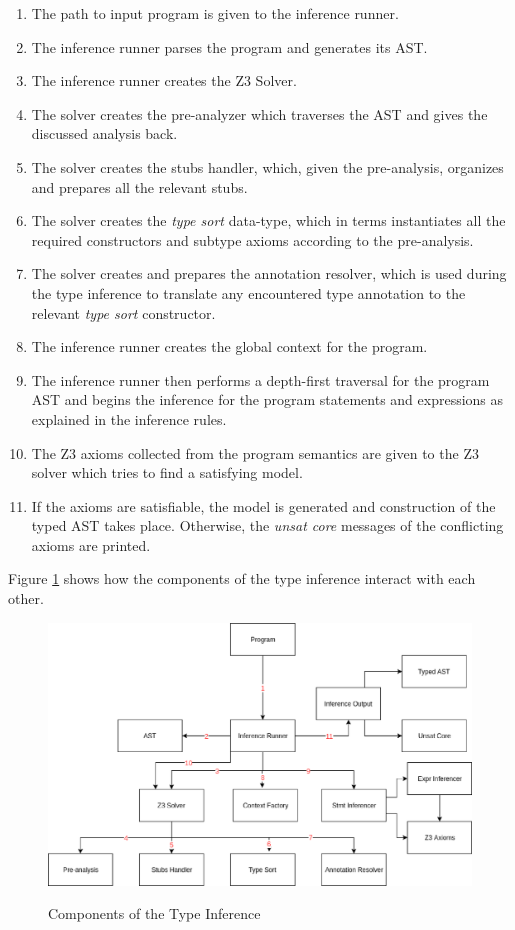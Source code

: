 \begin{enumerate}
	\item The path to input program is given to the inference runner.
	\item The inference runner parses the program and generates its AST.
	\item The inference runner creates the Z3 Solver.
	\item The solver creates the pre-analyzer which traverses the AST and gives the discussed analysis back.
	\item The solver creates the stubs handler, which, given the pre-analysis, organizes and prepares all the relevant stubs.
	\item The solver creates the \textit{type sort} data-type, which in terms instantiates all the required constructors and subtype axioms according to the pre-analysis.
	\item The solver creates and prepares the annotation resolver, which is used during the type inference to translate any encountered type annotation to the relevant \textit{type sort} constructor.
	\item The inference runner creates the global context for the program.
	\item The inference runner then performs a depth-first traversal for the program AST and begins the inference for the program statements and expressions as explained in the inference rules.
	\item The Z3 axioms collected from the program semantics are given to the Z3 solver which tries to find a satisfying model.
	\item If the axioms are satisfiable, the model is generated and construction of the typed AST takes place. Otherwise, the \textit{unsat core} messages of the conflicting axioms are printed.
\end{enumerate}

Figure \ref{fig:ti_comp} shows how the components of the type inference interact with each other.

\begin{figure}
	\centering
	\begin{mdframed}
		\centering
		\includegraphics[width=130mm]{images/TI_comp.eps}\\
	\end{mdframed}
	\caption{Components of the Type Inference}
	\label{fig:ti_comp}
\end{figure}